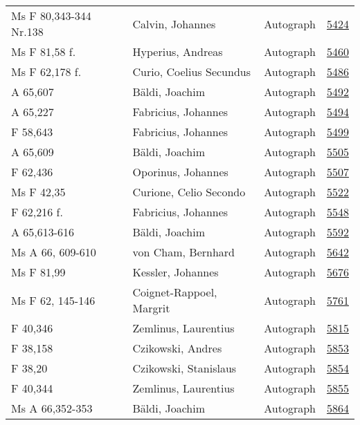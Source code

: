 \documentclass[10pt,a4paper,landscape]{report}
\begin{document}
\begin{longtable}{p{16cm}p{4cm}lr}
Ms F 80,343-344 Nr.138	&	Calvin, Johannes	&	Autograph	&	\href{http://130.60.24.72/assignment/5424}{5424}\\
Ms F 81,58 f.	&	Hyperius, Andreas	&	Autograph	&	\href{http://130.60.24.72/assignment/5460}{5460}\\
Ms F 62,178 f.	&	Curio, Coelius Secundus	&	Autograph	&	\href{http://130.60.24.72/assignment/5486}{5486}\\
A 65,607	&	Bäldi, Joachim	&	Autograph	&	\href{http://130.60.24.72/assignment/5492}{5492}\\
A 65,227	&	Fabricius, Johannes	&	Autograph	&	\href{http://130.60.24.72/assignment/5494}{5494}\\
F 58,643	&	Fabricius, Johannes	&	Autograph	&	\href{http://130.60.24.72/assignment/5499}{5499}\\
A 65,609	&	Bäldi, Joachim	&	Autograph	&	\href{http://130.60.24.72/assignment/5505}{5505}\\
F 62,436	&	Oporinus, Johannes	&	Autograph	&	\href{http://130.60.24.72/assignment/5507}{5507}\\
Ms F 42,35	&	Curione, Celio Secondo	&	Autograph	&	\href{http://130.60.24.72/assignment/5522}{5522}\\
F 62,216 f.	&	Fabricius, Johannes	&	Autograph	&	\href{http://130.60.24.72/assignment/5548}{5548}\\
A 65,613-616	&	Bäldi, Joachim	&	Autograph	&	\href{http://130.60.24.72/assignment/5592}{5592}\\
Ms A 66, 609-610	&	von Cham, Bernhard	&	Autograph	&	\href{http://130.60.24.72/assignment/5642}{5642}\\
Ms F 81,99	&	Kessler, Johannes	&	Autograph	&	\href{http://130.60.24.72/assignment/5676}{5676}\\
Ms F 62, 145-146	&	Coignet-Rappoel, Margrit	&	Autograph	&	\href{http://130.60.24.72/assignment/5761}{5761}\\
F 40,346	&	Zemlinus, Laurentius	&	Autograph	&	\href{http://130.60.24.72/assignment/5815}{5815}\\
F 38,158	&	Czikowski, Andres	&	Autograph	&	\href{http://130.60.24.72/assignment/5853}{5853}\\
F 38,20	&	Czikowski, Stanislaus	&	Autograph	&	\href{http://130.60.24.72/assignment/5854}{5854}\\
F 40,344	&	Zemlinus, Laurentius	&	Autograph	&	\href{http://130.60.24.72/assignment/5855}{5855}\\
Ms A 66,352-353	&	Bäldi, Joachim	&	Autograph	&	\href{http://130.60.24.72/assignment/5864}{5864}\\

\end{longtable}
\end{document}
